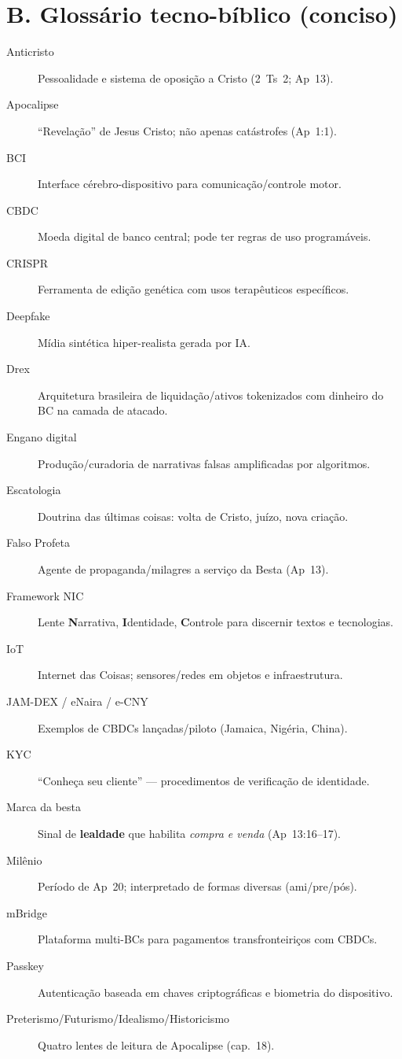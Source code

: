\bigskip
\section*{B. Glossário tecno-bíblico (conciso)}
\begin{description}
  \item[Anticristo] Pessoalidade e sistema de oposição a Cristo (2~Ts~2; Ap~13).
  \item[Apocalipse] ``Revelação'' de Jesus Cristo; não apenas catástrofes (Ap~1:1).
  \item[BCI] Interface cérebro-dispositivo para comunicação/controle motor.
  \item[CBDC] Moeda digital de banco central; pode ter regras de uso programáveis.
  \item[CRISPR] Ferramenta de edição genética com usos terapêuticos específicos.
  \item[Deepfake] Mídia sintética hiper-realista gerada por IA.
  \item[Drex] Arquitetura brasileira de liquidação/ativos tokenizados com dinheiro do BC na camada de atacado.
  \item[Engano digital] Produção/curadoria de narrativas falsas amplificadas por algoritmos.
  \item[Escatologia] Doutrina das últimas coisas: volta de Cristo, juízo, nova criação.
  \item[Falso Profeta] Agente de propaganda/milagres a serviço da Besta (Ap~13).
  \item[Framework NIC] Lente \textbf{N}arrativa, \textbf{I}dentidade, \textbf{C}ontrole para discernir textos e tecnologias.
  \item[IoT] Internet das Coisas; sensores/redes em objetos e infraestrutura.
  \item[JAM-DEX / eNaira / e-CNY] Exemplos de CBDCs lançadas/piloto (Jamaica, Nigéria, China).
  \item[KYC] ``Conheça seu cliente'' — procedimentos de verificação de identidade.
  \item[Marca da besta] Sinal de \textbf{lealdade} que habilita \emph{compra e venda} (Ap~13:16--17).
  \item[Milênio] Período de Ap~20; interpretado de formas diversas (ami/pre/pós).
  \item[mBridge] Plataforma multi-BCs para pagamentos transfronteiriços com CBDCs.
  \item[Passkey] Autenticação baseada em chaves criptográficas e biometria do dispositivo.
  \item[Preterismo/Futurismo/Idealismo/Historicismo] Quatro lentes de leitura de Apocalipse (cap.~18).

\end{description}
